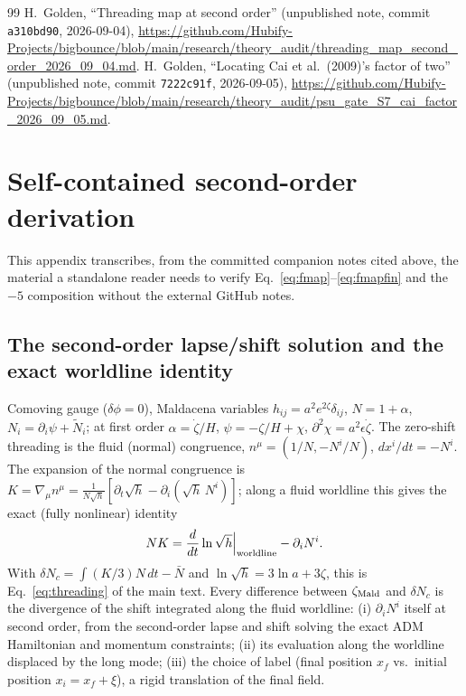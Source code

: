 \documentclass[aps,prd,twocolumn,superscriptaddress,showpacs,preprintnumbers,nofootinbib,longbibliography,floatfix]{revtex4-2}
\newcommand{\eps}{\epsilon}
\begin{document}
\begin{thebibliography}{99}
 H.~Golden, ``Threading map at second order'' (unpublished note, commit \texttt{a310bd90}, 2026-09-04), \url{https://github.com/Hubify-Projects/bigbounce/blob/main/research/theory_audit/threading_map_second_order_2026_09_04.md}.
 H.~Golden, ``Locating Cai et al.\ (2009)'s factor of two'' (unpublished note, commit \texttt{7222c91f}, 2026-09-05), \url{https://github.com/Hubify-Projects/bigbounce/blob/main/research/theory_audit/psu_gate_S7_cai_factor_2026_09_05.md}.

\end{thebibliography}

\appendix
\section{Self-contained second-order derivation}

This appendix transcribes, from the committed companion notes cited above, the material a
standalone reader needs to verify Eq.~\eqref{eq:fmap}--\eqref{eq:fmapfin} and the $-5$
composition without the external GitHub notes.

\subsection{The second-order lapse/shift solution and the exact worldline identity}

Comoving gauge ($\delta\phi=0$), Maldacena variables $h_{ij}=a^2e^{2\zeta}\delta_{ij}$,
$N=1+\alpha$, $N_i=\partial_i\psi+\tilde N_i$; at first order $\alpha=\dot\zeta/H$,
$\psi=-\zeta/H+\chi$, $\partial^2\chi=a^2\eps\dot\zeta$. The zero-shift threading is the
fluid (normal) congruence, $n^\mu=(1/N,-N^i/N)$, $dx^i/dt=-N^i$. The expansion of the normal
congruence is $K=\nabla_\mu n^\mu=\frac{1}{N\sqrt h}[\partial_t\sqrt h-\partial_i(\sqrt h\,N^i)]$;
along a fluid worldline this gives the exact (fully nonlinear) identity
\begin{equation}
NK=\frac{d}{dt}\ln\sqrt h\Big|_{\rm worldline}-\partial_iN^i.
\end{equation}
With $\delta N_c=\int(K/3)N\,dt-\bar N$ and $\ln\sqrt h=3\ln a+3\zeta$, this is Eq.~\eqref{eq:threading}
of the main text. Every difference between $\zeta_{\rm Mald}$ and $\delta N_c$ is the divergence of
the shift integrated along the fluid worldline: (i) $\partial_iN^i$ itself at second order, from
the second-order lapse and shift solving the exact ADM Hamiltonian and momentum constraints;
(ii) its evaluation along the worldline displaced by the long mode; (iii) the choice of label
(final position $x_f$ vs.\ initial position $x_i=x_f+\xi$), a rigid translation of the final
field.
\end{document}
